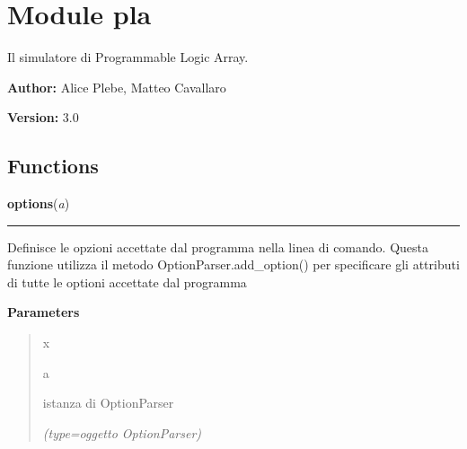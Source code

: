 %
%
%


\section{Module pla}

    \label{pla}
Il simulatore di Programmable Logic Array.

\textbf{Author:} Alice Plebe, Matteo Cavallaro



\textbf{Version:} 3.0





  \subsection{Functions}

    \label{pla:options}

    \vspace{0.5ex}

\hspace{.8\funcindent}\begin{boxedminipage}{\funcwidth}

    \raggedright \textbf{options}(\textit{a})

    \vspace{-1.5ex}

    \rule{\textwidth}{0.5\fboxrule}
\setlength{\parskip}{2ex}
    Definisce le opzioni accettate dal programma nella linea di comando. 
    Questa funzione utilizza il metodo OptionParser.add\_option() per 
    specificare gli attributi di tutte le optioni accettate dal programma

\setlength{\parskip}{1ex}
      \textbf{Parameters}
      \vspace{-1ex}

      \begin{quote}
        \begin{Ventry}{x}

          \item[a]

          istanza di OptionParser

            {\it (type=oggetto OptionParser)}

        \end{Ventry}

      \end{quote}

    \end{boxedminipage}


